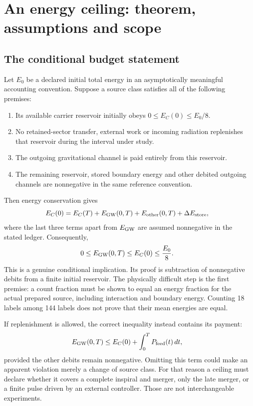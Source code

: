 \section{An energy ceiling: theorem, assumptions and scope}
\subsection{The conditional budget statement}
Let $E_0$ be a declared initial total energy in an asymptotically meaningful accounting convention. Suppose a source class satisfies all of the following premises:
\begin{enumerate}
\item Its available carrier reservoir initially obeys $0\leq E_C(0)\leq E_0/8$.
\item No retained-sector transfer, external work or incoming radiation replenishes that reservoir during the interval under study.
\item The outgoing gravitational channel is paid entirely from this reservoir.
\item The remaining reservoir, stored boundary energy and other debited outgoing channels are nonnegative in the same reference convention.
\end{enumerate}
Then energy conservation gives
\begin{equation}
 E_C(0)=E_C(T)+E_{\rm GW}(0,T)+E_{\rm other}(0,T)
             +\Delta E_{\rm store},
 \label{c11:budget}
\end{equation}
where the last three terms apart from $E_{\rm GW}$ are assumed nonnegative in the stated ledger. Consequently,
\begin{equation}
 0\leq E_{\rm GW}(0,T)\leq E_C(0)\leq \frac{E_0}{8}.
 \label{c11:ceiling}
\end{equation}
This is a genuine conditional implication. Its proof is subtraction of nonnegative debits from a finite initial reservoir. The physically difficult step is the first premise: a count fraction must be shown to equal an energy fraction for the actual prepared source, including interaction and boundary energy. Counting 18 labels among 144 labels does not prove that their mean energies are equal.

If replenishment is allowed, the correct inequality instead contains its payment:
\begin{equation}
 E_{\rm GW}(0,T)\leq E_C(0)+\int_0^T P_{\rm feed}(t)\,dt,
 \label{c11:replenished}
\end{equation}
provided the other debits remain nonnegative. Omitting this term could make an apparent violation merely a change of source class. For that reason a ceiling must declare whether it covers a complete inspiral and merger, only the late merger, or a finite pulse driven by an external controller. Those are not interchangeable experiments.

